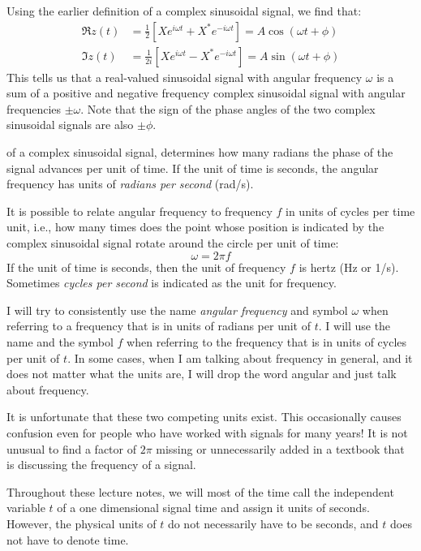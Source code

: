 Using the earlier definition of a complex sinusoidal signal, we find that:
\begin{align}
  \Re{z(t)} & = \frac{1}{2}\left[X e^{i\omega t} + X^* e^{-i\omega t}\right] = A\cos(\omega t + \phi) \label{eq:resignal}  \\
  \Im{z(t)} & = \frac{1}{2i}\left[X e^{i\omega t} - X^* e^{-i\omega t}\right] = A\sin(\omega t + \phi) \label{eq:imsignal}
\end{align}
This tells us that a real-valued sinusoidal signal with angular frequency $\omega$
is a sum of a positive and negative frequency complex sinusoidal signal with angular
frequencies $\pm\omega$. Note that the sign of the phase angles of the two
complex sinusoidal signals are also $\pm\phi$.

 of a complex sinusoidal signal, determines
how many radians the phase of the signal advances per unit of time. If the unit of
time is seconds, the angular frequency has units of \emph{radians per second} (rad/s).

It is possible to relate angular frequency to frequency $f$ in units of cycles per time
unit, i.e., how many times does the point whose position is indicated by the complex sinusoidal
signal rotate around the circle per unit of time:
\begin{equation}
  \boxed{\omega = 2\pi f}
\end{equation}
If the unit of time is seconds, then the unit of frequency $f$ is hertz (Hz or 1/s).
Sometimes \emph{cycles per second} is indicated as the unit for frequency.

I will try to consistently use the name \emph{angular frequency} and symbol $\omega$
when referring to a frequency that is in units of radians per unit of $t$.
I will use the name \emph{} and the symbol $f$ when referring
to the frequency that is in units of cycles
per unit of $t$. In some cases, when I am talking about frequency in general,
and it does not matter what the units are, I will drop the word angular and just talk about frequency.

It is unfortunate that these two competing units exist.
This occasionally causes confusion even for people who have worked with signals for many years!
It is not unusual to find a factor of $2\pi$ missing or unnecessarily
added in a textbook that is discussing the frequency of a signal.

Throughout these lecture notes, we will most of the time call the
independent variable $t$ of a one dimensional signal time and assign it units of seconds.
However, the physical units of $t$ do not necessarily have to be seconds, and $t$ does not have to denote time.

